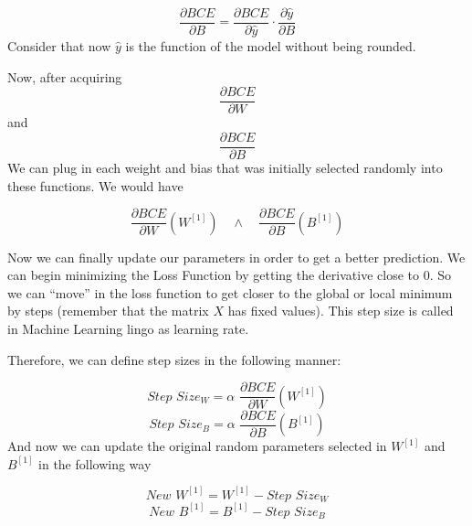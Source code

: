 \documentclass[12pt]{article}
\begin{document}
\begin{equation}
    \frac{\partial BCE}{\partial B} = \frac{\partial BCE}{\partial \hat{y}} \cdot \frac{\partial \hat{y}}{\partial B}
\end{equation}
Consider that now $\hat{y}$ is the function of the model without being rounded.

Now, after acquiring
\begin{equation}
    \frac{\partial BCE}{\partial W}
\end{equation}
and
\begin{equation}
    \frac{\partial BCE}{\partial B}
\end{equation}
We can plug in each weight and bias that was initially selected randomly into these functions. We would have

\begin{equation}
    \frac{\partial BCE}{\partial W} (W^{[1]}) \quad \wedge \quad \frac{\partial BCE}{\partial B} (B^{[1]})
\end{equation}

Now we can finally update our parameters in order to get a better prediction. We can begin minimizing the Loss Function by getting the derivative close to 0.
So we can ``move'' in the loss function to get closer to the global or local minimum by steps (remember that the matrix $X$ has fixed values). This step size is called in Machine Learning lingo as learning rate.


Therefore, we can define step sizes in the following manner:

\begin{equation}
    Step \, \, Size_W = \alpha \, \, \frac{\partial BCE}{\partial W} (W^{[1]})
\end{equation}
\begin{equation}
    Step \, \, Size_B = \alpha \, \, \frac{\partial BCE}{\partial B} (B^{[1]})
\end{equation}
And now we can update the original random parameters selected in $W^{[1]}$ and $B^{[1]}$ in the following way

\begin{equation}
    New \, \, W^{[1]} = W^{[1]} - Step \, \, Size_W
\end{equation}
\begin{equation}
    New \, \, B^{[1]} = B^{[1]} - Step \, \, Size_B
\end{equation}
\end{document}
